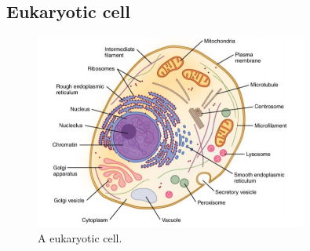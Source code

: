 \documentclass[jmp, amsmath, amssymb, reprint]{article}
\numberwithin{equation}{section}
\begin{document}
\subsection{Eukaryotic cell}

\begin{figure}[H]
	\centering
  	\includegraphics[width=0.8\textwidth]{cell_eu}
	\caption{A eukaryotic cell.}
	\label{fig:cell_eu}
\end{figure}
\end{document}
